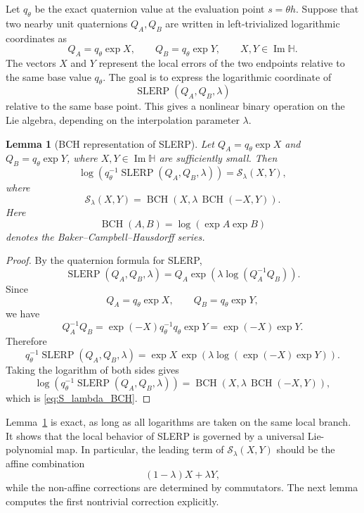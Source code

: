 \documentclass[a4paper,11pt]{article}
\newcommand{\bH}{\mathbb{H}}
\newcommand{\SLERP}{\operatorname{SLERP}}
\newcommand{\BCH}{\operatorname{BCH}}
\newcommand{\ImH}{\operatorname{Im}\bH}
\numberwithin{equation}{section}
\theoremstyle{plain}
\newtheorem{lemma}[thm]{Lemma}
\theoremstyle{definition}
\theoremstyle{remark}
\begin{document}
Let \(q_\theta\) be the exact quaternion value at the evaluation point
\(s=\theta h\).  Suppose that two nearby unit quaternions \(Q_A,Q_B\) are
written in left-trivialized logarithmic coordinates as
\[
        Q_A=q_\theta\exp X,
        \qquad
        Q_B=q_\theta\exp Y,
        \qquad X,Y\in\ImH .
\]
The vectors \(X\) and \(Y\) represent the local errors of the two endpoints
relative to the same base value \(q_\theta\).  The goal is to express the
logarithmic coordinate of
\[
        \SLERP(Q_A,Q_B,\lambda)
\]
relative to the same base point.  This gives a nonlinear binary operation on
the Lie algebra, depending on the interpolation parameter \(\lambda\).

\begin{lemma}[BCH representation of SLERP]
\label{lem:bch_slerp}
Let \(Q_A=q_\theta\exp X\) and \(Q_B=q_\theta\exp Y\), where
\(X,Y\in\ImH\) are sufficiently small.  Then
\[
\log\!\left(q_\theta^{-1}\SLERP(Q_A,Q_B,\lambda)\right)
=
\mathcal S_\lambda(X,Y),
\]
where
\begin{equation}
\label{eq:S_lambda_BCH}
        \mathcal S_\lambda(X,Y)
        =
        \BCH\!\left(X,\lambda\,\BCH(-X,Y)\right).
\end{equation}
Here
\[
        \BCH(A,B)=\log(\exp A\exp B)
\]
denotes the Baker--Campbell--Hausdorff series.
\end{lemma}

\begin{proof}
By the quaternion formula for SLERP,
\[
\SLERP(Q_A,Q_B,\lambda)
=
Q_A\exp\!\left(\lambda\log(Q_A^{-1}Q_B)\right).
\]
Since
\[
        Q_A=q_\theta\exp X,
        \qquad
        Q_B=q_\theta\exp Y,
\]
we have
\[
        Q_A^{-1}Q_B
        =
        \exp(-X)q_\theta^{-1}q_\theta\exp Y
        =
        \exp(-X)\exp Y .
\]
Therefore
\[
q_\theta^{-1}\SLERP(Q_A,Q_B,\lambda)
=
\exp X\,
\exp\!\left(\lambda\log(\exp(-X)\exp Y)\right).
\]
Taking the logarithm of both sides gives
\[
\log\!\left(q_\theta^{-1}\SLERP(Q_A,Q_B,\lambda)\right)
=
\BCH\!\left(
X,
\lambda\,\BCH(-X,Y)
\right),
\]
which is \eqref{eq:S_lambda_BCH}.
\end{proof}

Lemma~\ref{lem:bch_slerp} is exact, as long as all logarithms are taken on the
same local branch.  It shows that the local behavior of SLERP is governed by a
universal Lie-polynomial map.  In particular, the leading term of
\(\mathcal S_\lambda(X,Y)\) should be the affine combination
\[
        (1-\lambda)X+\lambda Y,
\]
while the non-affine corrections are determined by commutators.  The next
lemma computes the first nontrivial correction explicitly.
\end{document}
